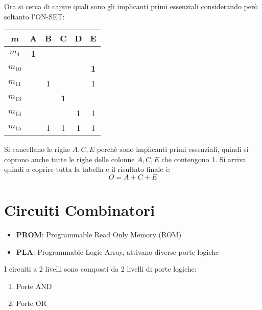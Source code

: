 \documentclass[a4paper]{article}
\theoremstyle{break}
\theoremstyle{break}
\theoremstyle{break}
\theoremstyle{break}
\begin{document}
\begin{example}
        Ora si cerca di capire quali sono gli implicanti primi essenziali considerando
        però soltanto l'ON-SET:
        \begin{center}
            \begin{tabular}{c|c|c|c|c|c}
                m & A & B & C & D & E \\
                \hline
                \( m_4 \) & \textbf{1} &  &  &  &  \\ 
                \hline
                \( m_{10} \) &  &  &  &  & \textbf{1} \\
                \hline
                \( m_{11} \) &  & 1 &  &  & 1 \\
                \hline
                \( m_{13} \) &  &  & \textbf{1} &  &  \\
                \hline
                \( m_{14} \) &  &  &  & 1 & 1 \\
                \hline
                \( m_{15} \) &  & 1 & 1 & 1 & 1 
            \end{tabular}
        \end{center}
        Si cancellano le righe \( A, C, E \) perchè sono implicanti primi essenziali,
        quindi si coprono anche tutte le righe delle colonne \( A, C, E \) che
        contengono 1. Si arriva quindi a coprire tutta la tabella e il risultato
        finale è:
        \[
        O = A + C + E
        \] 
\end{example}



\section{Circuiti Combinatori}
\begin{itemize}
    \item \textbf{PROM}: Programmable Read Only Memory (ROM)
        \item \textbf{PLA}: Programmable Logic Array, attivano diverse porte logiche
\end{itemize}
I circuiti a 2 livelli sono composti da 2 livelli di porte logiche:
\begin{enumerate}
    \item Porte AND
        \item Porte OR
\end{enumerate}
\end{document}
